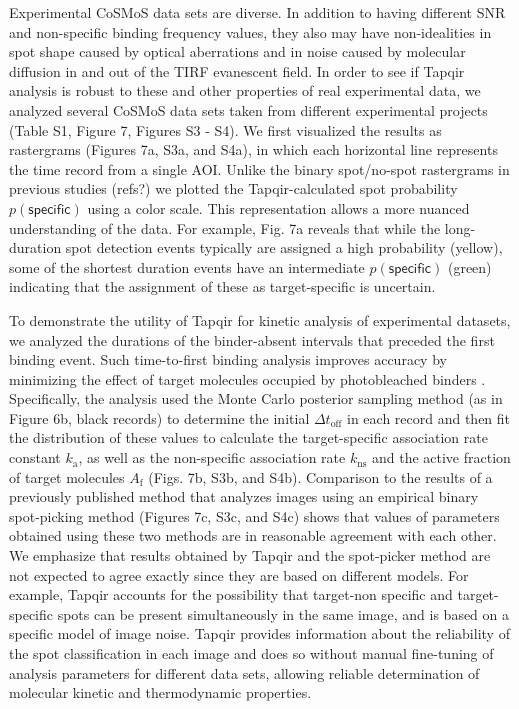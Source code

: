 Experimental CoSMoS data sets are diverse.  In addition to having different SNR and non-specific binding frequency values, they also may have non-idealities in spot shape caused by optical aberrations and in noise caused by molecular diffusion in and out of the TIRF evanescent field.  In order to see if Tapqir analysis is robust to these and other properties of real experimental data, we  analyzed several CoSMoS data sets taken from different experimental projects (Table S1, Figure 7, Figures S3 - S4). We first visualized the results as rastergrams (Figures 7a, S3a, and S4a), in which each horizontal line represents the time record from a single AOI.  Unlike the binary spot/no-spot rastergrams in previous studies (refs?) we plotted the Tapqir-calculated spot probability $p(\mathsf{specific})$ using a color scale.  This representation allows a more nuanced understanding of the data.  For example, Fig. 7a reveals that while the long-duration spot detection events typically are assigned a high probability (yellow), some of the shortest duration events have an intermediate $p(\mathsf{specific})$ (green) indicating that the assignment of these as target-specific is uncertain.  

To demonstrate the utility of Tapqir for kinetic analysis of experimental datasets, we analyzed the durations of the binder-absent intervals that preceded the first binding event.  Such time-to-first binding analysis improves accuracy by minimizing the effect of target molecules occupied by photobleached binders \cite{Friedman2006-kb}.  Specifically, the analysis used the Monte Carlo posterior sampling method (as in Figure 6b, black records) to determine the initial  $\Delta t_\mathrm{off}$ in each record and then fit the distribution of these values to calculate the target-specific association rate constant $k_\mathrm{a}$, as well as the non-specific association rate $k_\mathrm{ns}$ and the active fraction of target molecules $A_\mathrm{f}$ (Figs. 7b, S3b, and S4b). Comparison to the results of a previously published method that analyzes images using an empirical binary spot-picking method \cite{Friedman2006-kb} (Figures 7c, S3c, and S4c) shows that values of parameters obtained using these two methods are in reasonable agreement with each other. We emphasize that results obtained by Tapqir and the spot-picker method are not expected to agree exactly since they are based on different models.  For example, Tapqir accounts for the possibility that target-non specific and target-specific spots can be present simultaneously in the same image, and is based on a specific model of image noise.  Tapqir provides information about the reliability of the spot classification in each image and does so without manual fine-tuning of analysis parameters for different data sets, allowing reliable determination of molecular kinetic and thermodynamic properties.

